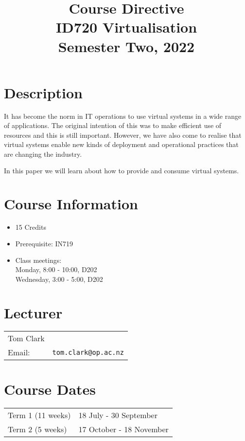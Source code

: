 \documentclass{article}
\begin{document}
\title{Course Directive\\ID720 Virtualisation\\Semester Two, 2022}
\date{}
\maketitle

\section*{Description}
It has become the norm in IT operations to use virtual systems in a wide range of applications.  The original intention of this was to make efficient use of resources and this is still important.  However, we have also come to realise that virtual systems enable new kinds of deployment and operational practices that are changing the industry.

In this paper we will learn about how to provide and consume virtual systems.

\section*{Course Information}
\begin{itemize}
  \item 15 Credits
  \item Prerequisite: IN719
  \item Class meetings: \\Monday, 8:00 - 10:00, D202 \\Wednesday, 3:00 - 5:00, D202
\end{itemize}

\section*{Lecturer}
\begin{tabular}{lr}

  Tom Clark &    \\
     Email: & \texttt{tom.clark@op.ac.nz} \\
\end{tabular}

\section*{Course Dates}
\begin{tabular}{ll}
Term 1 (11 weeks) & 18 July - 30 September \\
Term 2 (5 weeks) & 17 October - 18 November \\
\end{tabular}
\end{document}
